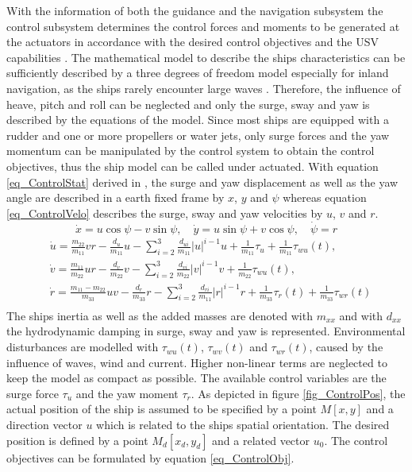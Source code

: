    With the information of both the guidance and the navigation subsystem the control subsystem determines the control forces and moments to be generated at the actuators in accordance with the desired control objectives and the \ac{USV} capabilities \cite{Liu2016}. The mathematical model to describe the ships characteristics can be sufficiently described by a three degrees of freedom model especially for inland navigation, as the ships rarely encounter large waves \cite{Control3DOF}. Therefore, the influence of heave, pitch and roll can be neglected and only the surge, sway and yaw is described by the equations of the model. Since most ships are equipped with a rudder and one or more propellers or water jets, only surge forces and the yaw momentum can be manipulated by the control system to obtain the control objectives, thus the ship model can be called under actuated. With equation \ref{eq_ControlStat} derived in \cite{ControlUnder}, the surge and yaw displacement as well as the yaw angle are described in a earth fixed frame by $x$, $y$ and $\psi$ whereas equation \ref{eq_ControlVelo} describes the surge, sway and yaw velocities by $u$, $v$ and $r$. 
  \begin{equation}
  \label{eq_ControlStat}
  \dot x= u \cos\psi- v \sin\psi, \quad \dot y= u \sin\psi+ v  \cos\psi, \quad \dot \psi= r  
  \end{equation}
  \begin{equation}
  \begin{aligned} 
  \label{eq_ControlVelo}
  & \dot u= \frac{m_{22}}{m_{11}}vr-\frac{d_u}{m_{11}}u- \sum_{i=2}^{3}\frac{d_{ui}}{m_{11}}|u|^{i-1}u+ \frac{1}{m_{11}}\tau_u+ \frac{1}{m_{11}}\tau_{wu}(t),\\
  & \dot v= \frac{m_{11}}{m_{22}}ur-\frac{d_v}{m_{22}}v- \sum_{i=2}^{3}\frac{d_{vi}}{m_{22}}|v|^{i-1}v+ \frac{1}{m_{22}}\tau_{wu}(t),\\
  & \dot r= \frac{m_{11}-m_{22}}{m_{33}}uv-\frac{d_r}{m_{33}}r- \sum_{i=2}^{3}\frac{d_{ri}}{m_{11}}|r|^{i-1}r+ \frac{1}{m_{33}}\tau_{r}(t)+ \frac{1}{m_{33}}\tau_{wr}(t)\\
  \end{aligned}
  \end{equation}
  The ships inertia as well as the added masses are denoted with $m_{xx}$ and with $d_{xx}$ the hydrodynamic damping in surge, sway and yaw is represented. Environmental disturbances are modelled with $\tau_{wu}(t)$, $\tau_{wv}(t)$ and $\tau_{wr}(t)$, caused by the influence of waves, wind and current. Higher non-linear terms are neglected to keep the model as compact as possible. The available control variables are the surge force $\tau_u$ and the yaw moment $\tau_r$. As depicted in figure \ref{fig_ControlPos}, the actual position of the ship is assumed to be specified by a point $M[x,y]$ and a direction vector $u$ which is related to the ships spatial orientation. The desired position is defined by a point $M_d[x_d,y_d]$ and a related vector $u_0$. The control objectives can be formulated by equation \ref{eq_ControlObj}. 
